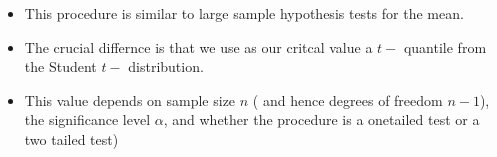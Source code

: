 \documentclass[]{report}
\begin{document}

\begin{itemize}
\item This procedure is similar to large sample hypothesis tests for the mean. \medskip
\item The crucial differnce is that we use as our critcal value a $t-$ quantile from the Student $t-$ distribution. \medskip
\item This value depends on sample size $n$ ( and hence degrees of freedom $n-1$), the significance level $\alpha$, and whether the procedure is a onetailed test or a two tailed test)
\end{itemize}
\end{document}
